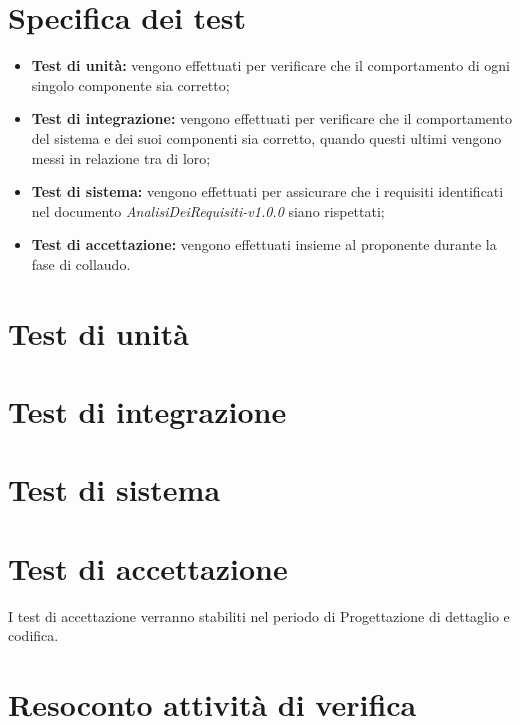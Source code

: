 \section{Specifica dei test}

\begin{itemize}
    \item \textbf{Test di unità:} vengono effettuati per verificare che il comportamento di ogni singolo componente sia corretto;
    \item \textbf{Test di integrazione:} vengono effettuati per verificare che il comportamento del sistema e dei suoi componenti sia corretto, quando questi ultimi vengono messi in relazione tra di loro;
    \item \textbf{Test di sistema:} vengono effettuati per assicurare che i requisiti identificati nel documento \textit{AnalisiDeiRequisiti-v1.0.0} siano rispettati;
    \item \textbf{Test di accettazione:} vengono effettuati insieme al proponente durante la fase di collaudo.
\end{itemize}

\section{Test di unità}




\section{Test di integrazione}


\section{Test di sistema}


\section{Test di accettazione}
I test di accettazione verranno stabiliti nel periodo di Progettazione di dettaglio e codifica.

\section{Resoconto attività di verifica}

